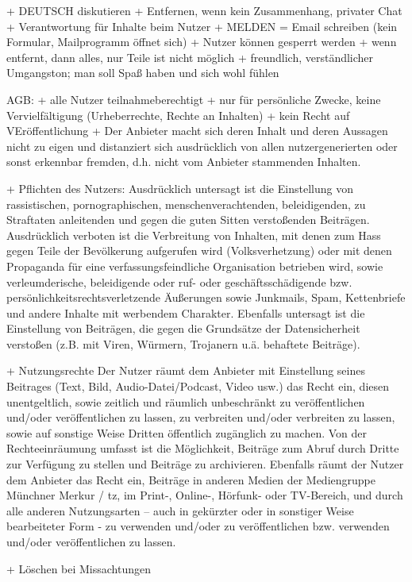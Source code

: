 + DEUTSCH diskutieren
+ Entfernen, wenn kein Zusammenhang, privater Chat
+ Verantwortung für Inhalte beim Nutzer
+ MELDEN = Email schreiben (kein Formular, Mailprogramm öffnet sich)
+ Nutzer können gesperrt werden
+ wenn entfernt, dann alles, nur Teile ist nicht möglich
+ freundlich, verständlicher Umgangston; man soll Spaß haben und sich wohl fühlen


AGB:
+ alle Nutzer teilnahmeberechtigt
+ nur für persönliche Zwecke, keine Vervielfältigung (Urheberrechte, Rechte an Inhalten)
+ kein Recht auf VEröffentlichung
+ Der Anbieter macht sich deren Inhalt und deren Aussagen nicht zu eigen und distanziert sich ausdrücklich von allen nutzergenerierten oder sonst erkennbar fremden, d.h. nicht vom Anbieter stammenden Inhalten.

+ Pflichten des Nutzers:
Ausdrücklich untersagt ist die Einstellung von rassistischen, pornographischen, menschenverachtenden, beleidigenden, zu Straftaten anleitenden und gegen die guten Sitten verstoßenden Beiträgen. Ausdrücklich verboten ist die Verbreitung von Inhalten, mit denen zum Hass gegen Teile der Bevölkerung aufgerufen wird (Volksverhetzung) oder mit denen Propaganda für eine verfassungsfeindliche Organisation betrieben wird, sowie verleumderische, beleidigende oder ruf- oder geschäftsschädigende bzw. persönlichkeitsrechtsverletzende Äußerungen sowie Junkmails, Spam, Kettenbriefe und andere Inhalte mit werbendem Charakter. Ebenfalls untersagt ist die Einstellung von Beiträgen, die gegen die Grundsätze der Datensicherheit verstoßen (z.B. mit Viren, Würmern, Trojanern u.ä. behaftete Beiträge).

+ Nutzungsrechte
Der Nutzer räumt dem Anbieter mit Einstellung seines Beitrages (Text, Bild, Audio-Datei/Podcast, Video usw.) das Recht ein, diesen unentgeltlich, sowie zeitlich und räumlich unbeschränkt zu veröffentlichen und/oder veröffentlichen zu lassen, zu verbreiten und/oder verbreiten zu lassen, sowie auf sonstige Weise Dritten öffentlich zugänglich zu machen. Von der Rechteeinräumung umfasst ist die Möglichkeit, Beiträge zum Abruf durch Dritte zur Verfügung zu stellen und Beiträge zu archivieren. Ebenfalls räumt der Nutzer dem Anbieter das Recht ein, Beiträge in anderen Medien der Mediengruppe Münchner Merkur / tz, im Print-, Online-, Hörfunk- oder TV-Bereich, und durch alle anderen Nutzungsarten – auch in gekürzter oder in sonstiger Weise bearbeiteter Form - zu verwenden und/oder zu veröffentlichen bzw. verwenden und/oder veröffentlichen zu lassen.

+ Löschen bei Missachtungen
